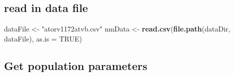 \documentclass[]{article}
\newenvironment{Shaded}{\begin{snugshade}}{\end{snugshade}}
\newcommand{\KeywordTok}[1]{\textcolor[rgb]{0.13,0.29,0.53}{\textbf{{#1}}}}
\newcommand{\DataTypeTok}[1]{\textcolor[rgb]{0.13,0.29,0.53}{{#1}}}
\newcommand{\StringTok}[1]{\textcolor[rgb]{0.31,0.60,0.02}{{#1}}}
\newcommand{\OtherTok}[1]{\textcolor[rgb]{0.56,0.35,0.01}{{#1}}}
\newcommand{\NormalTok}[1]{{#1}}
\begin{document}
\subsection{read in data file}\label{read-in-data-file}

\begin{Shaded}
\begin{Highlighting}[]
\NormalTok{dataFile <-}\StringTok{ "atorv1172atvb.csv"}
\NormalTok{nmData <-}\StringTok{ }\KeywordTok{read.csv}\NormalTok{(}\KeywordTok{file.path}\NormalTok{(dataDir, dataFile), }\DataTypeTok{as.is =} \OtherTok{TRUE}\NormalTok{)}
\end{Highlighting}
\end{Shaded}

\subsection{Get population parameters}\label{get-population-parameters}
\end{document}
